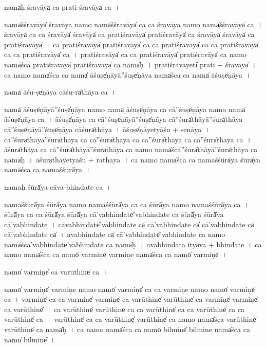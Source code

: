 \documentclass[parskip, DIV=14]{scrartcl}
\begin{document}
{nama̍ḥ śra॒vāya̍ ca prati-śra॒vāya̍ ca॒~।

nama̍śśra॒vāya̍ śra॒vāya॒ namo॒ nama̍śśra॒vāya̍ ca ca śra॒vāya॒ namo॒ nama̍śśra॒vāya̍ ca~।
śra॒vāya̍ ca ca śra॒vāya̍ śra॒vāya̍ ca pratiśra॒vāya̍ pratiśra॒vāya̍ ca śra॒vāya̍ śra॒vāya̍ ca pratiśra॒vāya̍~।
ca॒ pra॒ti॒śra॒vāya̍ pratiśra॒vāya̍ ca ca pratiśra॒vāya̍ ca ca pratiśra॒vāya̍ ca ca pratiśra॒vāya̍ ca~।
pra॒ti॒śra॒vāya̍ ca ca pratiśra॒vāya̍ pratiśra॒vāya̍ ca॒  namo॒ nama̍śca pratiśra॒vāya̍ pratiśra॒vāya̍ ca॒  nama̍ḥ~।
pra॒ti॒śra॒vāyeti̍ prati + śra॒vāya̍~। 
ca॒ namo॒ nama̍śca ca॒ nama̍ ā॒śuṣe̍ṇāyā॒''śuṣe̍ṇāya॒ nama̍śca ca॒ nama̍ ā॒śuṣe̍ṇāya~।

nama̍ ā॒śu-ṣe̍ṇāya cā॒śu-ra̍thāya ca॒~।

nama̍ ā॒śuṣe̍ṇāyā॒''śuṣe̍ṇāya॒ namo॒ nama̍ ā॒śuṣe̍ṇāya ca cā॒''śuṣe̍ṇāya॒ namo॒ nama̍ ā॒śuṣe̍ṇāya ca~। 
ā॒śuṣe̍ṇāya ca cā॒''śuṣe̍ṇāyā॒''śuṣe̍ṇāya cā॒''śura̍thāyā॒''śura̍thāya cā॒''śuṣe̍ṇāyā॒''śuṣe̍ṇāya cā॒śura̍thāya~। 
ā॒śuṣe̍ṇā॒yetyā॒śu + se॒nā॒ya॒~।
cā॒''śura̍thāyā॒''śura̍thāya ca cā॒''śura̍thāya ca cā॒''śura̍thāya ca cā॒''śura̍thāya ca~। 
ā॒śura̍thāya ca cā॒''śura̍thāyā॒''śura̍thāya ca॒ namo॒ nama̍ścā॒''śura̍thāyā॒''śura̍thāya ca॒ nama̍ḥ~।
āśura̍thā॒yetyā॒śu + ra॒thā॒ya॒~।
ca॒ namo॒ nama̍śca ca॒ nama॒śśūrā̍ya॒ śūrā̍ya॒ nama̍śca ca॒ nama॒śśūrā̍ya~।

nama॒ḥ śūrā̍ya cāva-bhinda॒te ca॒~।

nama॒śśūrā̍ya॒ śūrā̍ya॒ namo॒ nama॒śśūrā̍ya ca ca॒ śūrā̍ya॒ namo॒ nama॒śśūrā̍ya ca~।
śūrā̍ya ca ca॒ śūrā̍ya॒ śūrā̍ya cā'vabhinda॒te̍'vabhinda॒te ca॒ śūrā̍ya॒ śūrā̍ya cā'vabhinda॒te~।
cā॒va॒bhi॒nda॒te̍'vabhinda॒te  ca̍ cā'vabhinda॒te ca̍ cā'vabhinda॒te ca̍ cā'vabhinda॒te ca̍~।
a॒va॒bhi॒nda॒te ca̍ cā'vabhinda॒te̍'vabhinda॒te ca॒ namo॒ nama̍ścā'vabhinda॒te̍'vabhinda॒te ca॒ nama̍ḥ~।
a॒va॒bhi॒nda॒ta itya̍va + bhi॒nda॒te~।
ca॒ namo॒ nama̍śca ca॒ namo̍  va॒rmiṇe̍ va॒rmiṇe॒ nama̍śca ca॒ namo̍ va॒rmiṇe̎~।

namo̍ va॒rmiṇe̍ ca varū॒thine̍ ca~।

namo̍ va॒rmiṇe̍ va॒rmiṇe॒ namo॒ namo̍ va॒rmiṇe̍ ca ca va॒rmiṇe॒ namo॒ namo̍ va॒rmiṇe̍ ca~।
va॒rmiṇe̍ ca ca va॒rmiṇe̍ va॒rmiṇe̍ ca varū॒thine̍ varū॒thine̍ ca va॒rmiṇe̍ va॒rmiṇe̍ ca varū॒thine̎~।
ca॒ va॒rū॒thine̍ varū॒thine̍ ca ca varū॒thine̍ ca ca varū॒thine̍ ca ca varū॒thine̍ ca~।
va॒rū॒thine̍ ca ca varū॒thine̍ varū॒thine̍ ca॒ namo॒ nama̍śca varū॒thine̍ varū॒thine̍ ca॒ nama̍ḥ~।
ca॒ namo॒ nama̍śca ca॒ namo̍ bi॒lmine̍ bi॒lmine॒ nama̍śca ca॒ namo̍ bi॒lmine̎~।


}
\end{document}

